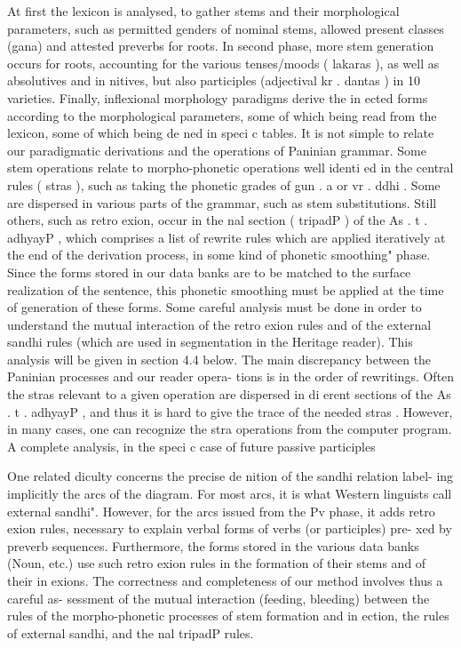 \documentclass[11pt]{article}
\begin{document}
At first the lexicon is analysed, to gather stems and their morphological parameters, such as permitted genders of nominal stems, allowed present classes (gana) and attested preverbs for roots. In second phase, more stem generation occurs for roots, accounting  for the various tenses/moods ( lakaras ), as well as absolutives and in nitives, but also participles (adjectival kr . dantas ) in 10 varieties. Finally, inflexional  morphology  paradigms  derive  the  in ected  forms  according  to  the morphological parameters, some of which being read from the lexicon, some of which being de ned in speci c tables. It is not simple to relate our paradigmatic derivations and the operations of Paninian grammar. Some stem operations relate to morpho-phonetic operations well identi ed in the central rules ( stras ), such as taking the phonetic grades of gun . a or vr . ddhi . Some are dispersed in various parts of the grammar, such as stem substitutions. Still others, such as retro exion, occur in the  nal section ( tripadP )  of  the As . t . adhyayP ,  which  comprises  a  list  of  rewrite  rules  which  are applied iteratively at the end of the derivation process, in some kind of phonetic smoothing" phase. Since the forms stored in our data banks are to be matched to the surface realization of the sentence, this phonetic smoothing must be applied at the time of generation of these forms. Some careful analysis must be done in order to understand the mutual interaction of the retro exion rules and of the external sandhi rules (which are used in segmentation in the Heritage reader). This analysis will be given in section 4.4 below. The main discrepancy between the Paninian processes and our reader opera- tions is in the order of rewritings. Often the stras relevant to a given operation are dispersed in di erent sections of the As . t . adhyayP , and thus it is hard to give the trace of the needed stras . However, in many cases, one can recognize the stra operations from the computer program. A complete analysis, in the speci c case of future passive participles  

One related diculty concerns the precise de nition of the sandhi relation label- ing implicitly the arcs of the diagram. For most arcs, it is what Western linguists call external sandhi". However, for the arcs issued from the Pv phase, it adds retro exion rules, necessary to explain verbal forms of verbs (or participles) pre-  xed by preverb sequences. Furthermore, the forms stored in the various data banks  (Noun,  etc.)  use  such  retro exion  rules  in  the  formation  of  their  stems and of their in exions. The correctness and completeness of our method involves thus a careful as- sessment of the mutual interaction (feeding, bleeding) between the rules of the morpho-phonetic processes of stem formation and in ection, the rules of external sandhi, and the  nal tripadP rules.
\end{document}
